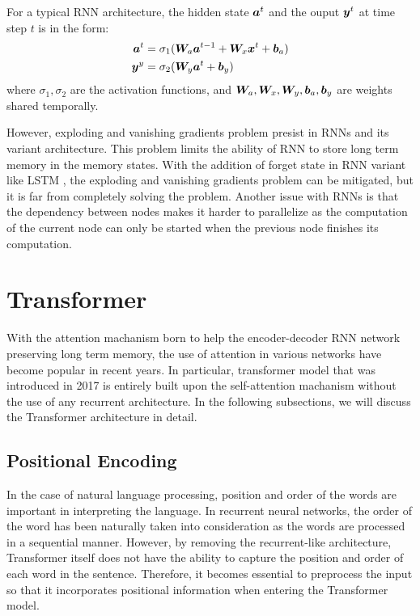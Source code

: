 \documentclass{article} %
\begin{document}
For a typical RNN architecture, the hidden state ${\bm{a}}^{t}$ and the ouput ${\bm{y}}^{t}$ at time step $t$ is in the form:
\begin{align}
        {\bm{a}}^{t} &= \sigma_{1} ( {\bm{W}}_{a} {\bm{a}}^{t-1} + {\bm{W}}_{x} {\bm{x}}^{t} + {\bm{b}}_{a} ) \\
        {\bm{y}}^{y} &= \sigma_{2} ( {\bm{W}}_{y} {\bm{a}}^{t} + {\bm{b}}_{y} )
\end{align}
where $\sigma_{1}, \sigma_{2}$ are the activation functions, and ${\bm{W}}_{a}, {\bm{W}}_{x}, {\bm{W}}_{y}, {\bm{b}}_{a}, {\bm{b}}_{y}$ are weights shared temporally.

However, exploding and vanishing gradients problem presist in RNNs and its variant architecture.
This problem limits the ability of RNN to store long term memory in the memory states.
With the addition of forget state in RNN variant like LSTM \citet{10.1162/neco.1997.9.8.1735}, the exploding and vanishing gradients problem can be mitigated, but it is far from completely solving the problem.
Another issue with RNNs is that the dependency between nodes makes it harder to parallelize as the computation of the current node can only be started when the previous node finishes its computation.


\section{Transformer}

With the attention machanism \citet{DBLP:journals/corr/BahdanauCB14} born to help the encoder-decoder RNN network preserving long term memory, the use of attention in various networks have become popular in recent years.
In particular, transformer model \citet{vaswani2017attention} that was introduced in 2017 is entirely built upon the self-attention machanism without the use of any recurrent architecture.
In the following subsections, we will discuss the Transformer architecture in detail.

\subsection{Positional Encoding}

In the case of natural language processing, position and order of the words are important in interpreting the language.
In recurrent neural networks, the order of the word has been naturally taken into consideration as the words are processed in a sequential manner.
However, by removing the recurrent-like architecture, Transformer itself does not have the ability to capture the position and order of each word in the sentence.
Therefore, it becomes essential to preprocess the input so that it incorporates positional information when entering the Transformer model.
\end{document}
